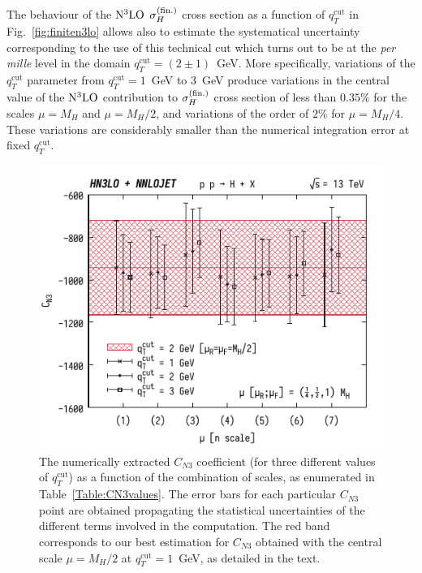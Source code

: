 \documentclass[12pt]{article}
\DeclareRobustCommand{\qtcut}{\ensuremath{q_T^\mathrm{cut}}}
\begin{document}
The behaviour of the $\rm N^3LO$ $\sigma_{H}^{(\rm fin.)}$ cross section as a function of $\qtcut$ in Fig.~\ref{fig:finiten3lo} allows also to estimate the systematical uncertainty corresponding to the use of this technical cut which turns out to be at the \textit{per mille} level in the domain $\qtcut=(2\pm 1)$~GeV. More specifically, variations of the $\qtcut$ parameter from $\qtcut=1$~GeV to 3~GeV produce variations in the central value of the 
$\rm N^3LO$ contribution to $\sigma_{H}^{(\rm fin.)}$ cross section of less than $0.35\%$ for the scales $\mu=M_{H}$ and $\mu=M_{H}/2$, and variations of the order of $2\%$ for $\mu=M_{H}/4$. These variations are considerably smaller than the numerical integration error at fixed $\qtcut$. 
\begin{figure}[t]
\centering
\includegraphics[width=.6\linewidth]{./new_figures/CN3_new_7_point_qT1_qT2_qT3}
\caption{\label{fig:CN3qT}{The numerically extracted $C_{N3}$ coefficient (for three different values of $\qtcut$) as a function of the combination of scales, as enumerated in Table~\ref{Table:CN3values}.
The error bars for each particular $C_{N3}$ point are obtained propagating the statistical uncertainties of the different terms involved in the computation. The red band corresponds to our best estimation for $C_{N3}$ obtained with the central scale $\mu=M_{H}/2$ at $\qtcut=1$~GeV, as detailed in the text.}}
\end{figure}
\end{document}
